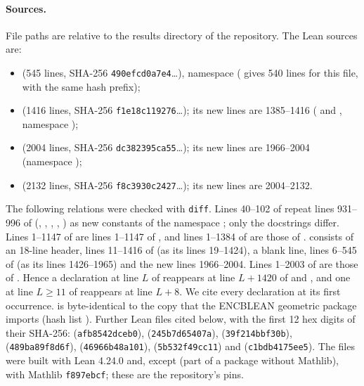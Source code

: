 \paragraph{Sources.} File paths are relative to the results directory  of
the repository. The Lean sources are:
\begin{itemize}
\item {} (545 lines, SHA-256 \texttt{490efcd0a7e4}\dots), namespace
   ( gives 540 lines for this file, with the same hash
  prefix);
\item {} (1416 lines, SHA-256 \texttt{f1e18c119276}\dots); its new lines are
  1385--1416 ( and , namespace );
\item {} (2004 lines, SHA-256 \texttt{dc382395ca55}\dots); its new lines are
  1966--2004 (namespace );
\item {} (2132 lines, SHA-256 \texttt{f8c3930c2427}\dots); its new lines are
  2004--2132.
\end{itemize}
The following relations were checked with \texttt{diff}. Lines 40--102 of 
repeat lines 931--996 of  (, ,
, , ) as new constants of the
namespace ; only the docstrings differ. Lines 1--1147 of  are
lines 1--1147 of , and lines 1--1384 of  are those of
.  consists of an 18-line header, lines 11--1416 of
 (as its lines 19--1424), a blank line, lines 6--545 of  (as
its lines 1426--1965) and the new lines 1966--2004. Lines 1--2003 of  are those of
. Hence a declaration at line $L$ of  reappears at line
$L+1420$ of  and , and one at line $L\ge 11$ of 
reappears at line $L+8$. We cite every declaration at its first occurrence.  is
byte-identical to the copy  that the ENCBLEAN geometric package
imports (hash list ). Further Lean files cited below, with the first 12 hex
digits of their SHA-256:  (\texttt{afb8542dceb0}), 
(\texttt{245b7d65407a}),  (\texttt{39f214bbf30b}),
 (\texttt{489ba89f8d6f}), 
(\texttt{46966b48a101}),  (\texttt{5b532f49cc11}) and
 (\texttt{c1bdb4175ee5}). The files were built with Lean 4.24.0 and, except
 (part of a package without Mathlib), with Mathlib \texttt{f897ebcf}; these
are the repository's pins.

